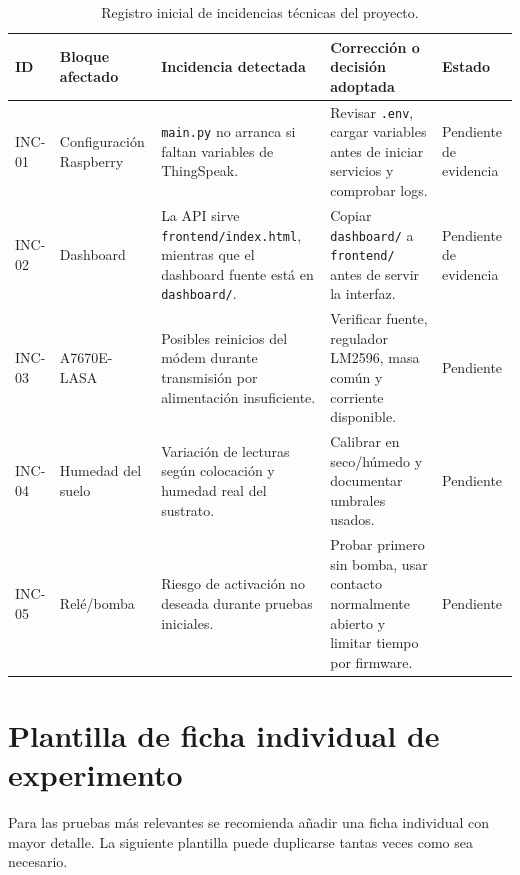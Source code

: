 \begin{table}[H]
\centering
\renewcommand{\arraystretch}{1.2}
\scriptsize
\begin{tabular}{|p{}|p{}|p{}|p{}|p{}|}
\hline
\rowcolor{gray!20}
\textbf{ID} & \textbf{Bloque afectado} & \textbf{Incidencia detectada} & \textbf{Corrección o decisión adoptada} & \textbf{Estado} \\
\hline
INC-01 & Configuración Raspberry & \texttt{main.py} no arranca si faltan variables de ThingSpeak. & Revisar \texttt{.env}, cargar variables antes de iniciar servicios y comprobar logs. & Pendiente de evidencia \\
\hline
INC-02 & Dashboard & La API sirve \texttt{frontend/index.html}, mientras que el dashboard fuente está en \texttt{dashboard/}. & Copiar \texttt{dashboard/} a \texttt{frontend/} antes de servir la interfaz. & Pendiente de evidencia \\
\hline
INC-03 & A7670E-LASA & Posibles reinicios del módem durante transmisión por alimentación insuficiente. & Verificar fuente, regulador LM2596, masa común y corriente disponible. & Pendiente \\
\hline
INC-04 & Humedad del suelo & Variación de lecturas según colocación y humedad real del sustrato. & Calibrar en seco/húmedo y documentar umbrales usados. & Pendiente \\
\hline
INC-05 & Relé/bomba & Riesgo de activación no deseada durante pruebas iniciales. & Probar primero sin bomba, usar contacto normalmente abierto y limitar tiempo por firmware. & Pendiente \\
\hline
\end{tabular}
\caption{Registro inicial de incidencias técnicas del proyecto.}
\label{tab:registro_incidencias_diario}
\end{table}

\section{Plantilla de ficha individual de experimento}

Para las pruebas más relevantes se recomienda añadir una ficha individual con mayor detalle. La siguiente plantilla puede duplicarse tantas veces como sea necesario.

